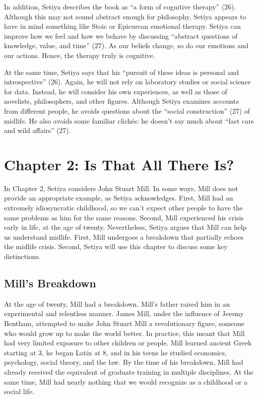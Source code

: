 \documentclass[12pt,letterpaper]{article}
\begin{document}
In addition, Setiya describes the book as ``a form of cognitive therapy'' (26).
Although this may not sound abstract enough for philosophy, Setiya appears to have in mind something like Stoic or Epicurean emotional therapy.
Setiya can improve how we feel and how we behave by discussing ``abstract questions of knowledge, value, and time'' (27).
As our beliefs change, so do our emotions and our actions.
Hence, the therapy truly is cognitive.

At the same time, Setiya says that his ``pursuit of these ideas is personal and introspective'' (26).
Again, he will not rely on laboratory studies or social science for data.
Instead, he will consider his own experiences, as well as those of novelists, philosophers, and other figures.
Although Setiya examines accounts from different people, he avoids questions about the ``social construction'' (27) of midlife.
He also avoids some familiar clichés: he doesn't say much about ``fast cars and wild affairs'' (27).

\section*{Chapter 2: Is That All There Is?}

In Chapter 2, Setiya considers John Stuart Mill.
In some ways, Mill does not provide an appropriate example, as Setiya acknowledges.
First, Mill had an extremely idiosyncratic childhood, so we can't expect other people to have the same problems as him for the same reasons.
Second, Mill experienced his crisis early in life, at the age of twenty.
Nevertheless, Setiya argues that Mill can help us understand midlife.
First, Mill undergoes a breakdown that partially echoes the midlife crisis.
Second, Setiya will use this chapter to discuss some key distinctions.

\subsection*{Mill's Breakdown}

At the age of twenty, Mill had a breakdown.
Mill's father raised him in an experimental and relentless manner.
James Mill, under the influence of Jeremy Bentham, attempted to make John Stuart Mill a revolutionary figure, someone who would grow up to make the world better.
In practice, this meant that Mill had very limited exposure to other children or people.
Mill learned ancient Greek starting at 3, he began Latin at 8, and in his teens he studied economics, psychology, social theory, and the law.
By the time of his breakdown, Mill had already received the equivalent of graduate training in multiple disciplines.
At the same time, Mill had nearly nothing that we would recognize as a childhood or a social life.
\end{document}
